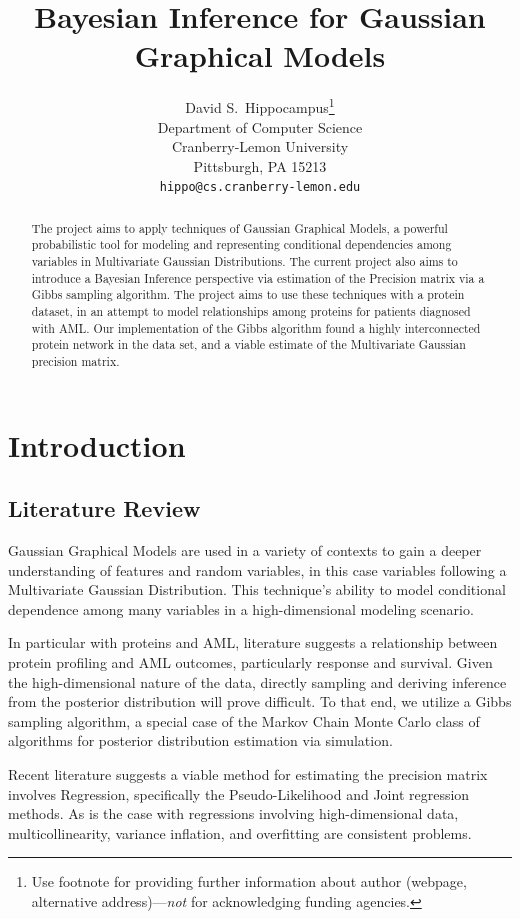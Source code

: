 \documentclass{article}
\title{Bayesian Inference for Gaussian Graphical Models}
\author{
  David S.~Hippocampus\thanks{Use footnote for providing further information
    about author (webpage, alternative address)---\emph{not} for acknowledging
    funding agencies.} \\
  Department of Computer Science\\
  Cranberry-Lemon University\\
  Pittsburgh, PA 15213 \\
  \texttt{hippo@cs.cranberry-lemon.edu} \\
}
\begin{document}
\maketitle


\begin{abstract}
  The project aims to apply techniques of Gaussian Graphical Models, a powerful probabilistic tool for modeling and representing conditional dependencies among variables in Multivariate Gaussian Distributions. The current project also aims to introduce a Bayesian Inference perspective via estimation of the Precision matrix via a Gibbs sampling algorithm. The project aims to use these techniques with a protein dataset, in an attempt to model relationships among proteins for patients diagnosed with AML. Our implementation of the Gibbs algorithm found a highly interconnected protein network in the data set, and a viable estimate of the Multivariate Gaussian precision matrix. 
\end{abstract}


\section{Introduction}

\subsection{Literature Review}

Gaussian Graphical Models are used in a variety of contexts to gain a deeper understanding of features and random variables, in this case variables following a Multivariate Gaussian Distribution. This technique's ability to model conditional dependence among many variables in a high-dimensional modeling scenario. 

In particular with proteins and AML, literature suggests a relationship between protein profiling and AML outcomes, particularly response and survival. Given the high-dimensional nature of the data, directly sampling and deriving inference from the posterior distribution will prove difficult. To that end, we utilize a Gibbs sampling algorithm, a special case of the Markov Chain Monte Carlo class of algorithms for posterior distribution estimation via simulation. 

Recent literature suggests a viable method for estimating the precision matrix involves Regression, specifically the Pseudo-Likelihood and Joint regression methods. As is the case with regressions involving high-dimensional data, multicollinearity, variance inflation, and overfitting are consistent problems. 
\end{document}
